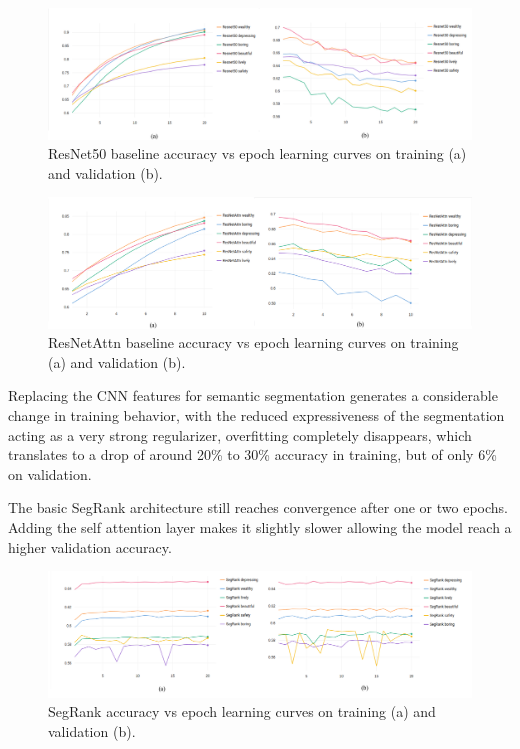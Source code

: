 \begin{figure}[ht]
	\begin{center}
	\includegraphics[width=1\textwidth]{./figures/resnet50_graph.png}
	\caption[ResNet Training curves]{
        ResNet50 baseline accuracy vs epoch learning curves on training (a) and validation (b).
        }
	\label{fig:resnet_graph}
	\end{center}
\end{figure}

\begin{figure}[ht]
	\begin{center}
	\includegraphics[width=1\textwidth]{./figures/resnet_attn_graph.png}
	\caption[ResNetAttn Training curves]{
        ResNetAttn baseline accuracy vs epoch learning curves on training (a) and validation (b).
        }
	\label{fig:resnet_attn_graph}
	\end{center}
\end{figure}

Replacing the CNN features for semantic segmentation generates a considerable change in training
behavior, with the reduced expressiveness of the segmentation acting as a very strong regularizer,
overfitting completely disappears, which translates to a drop of around 20\% to 30\% accuracy in training,
but of only 6\% on validation.

The basic SegRank architecture still reaches convergence after one or two epochs.
Adding the self attention layer makes it slightly slower allowing the model reach a higher validation accuracy.


\begin{figure}[ht]
	\begin{center}
	\includegraphics[width=1\textwidth]{./figures/segrank_graph.png}
	\caption[SegRank Training curves]{
        SegRank accuracy vs epoch learning curves on training (a) and validation (b).
        }
	\label{fig:segrank_graph}
	\end{center}
\end{figure}

